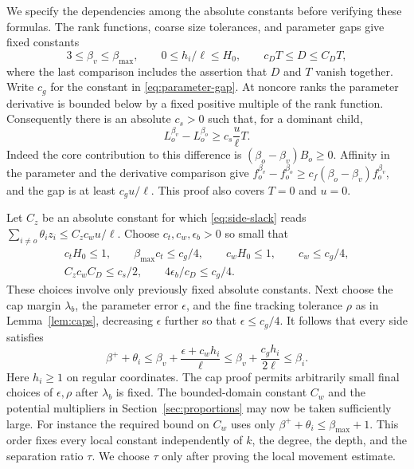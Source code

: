 We specify the dependencies among the absolute constants before verifying
these formulas.  The rank functions, coarse size tolerances, and parameter
gaps give fixed constants
\[
 3\le\beta_v\le\beta_{\max},\qquad
 0\le h_i/\ell\le H_0,\qquad
 c_DT\le D\le C_DT,
\]
where the last comparison includes the assertion that \(D\) and \(T\)
vanish together.  Write \(c_g\) for the constant in
\eqref{eq:parameter-gap}.  At noncore ranks the parameter derivative is
bounded below by a fixed positive multiple of the rank function.
Consequently there is an absolute \(c_s>0\) such that, for a dominant
child,
\begin{equation}
 L_o^{\beta_v}-L_o^{\beta_o}
   \ge c_s\frac{u}{\ell}T.
 \label{eq:dominant-output-slack}
\end{equation}
Indeed the core contribution to this difference is
\((\beta_o-\beta_v)B_o\ge0\).  Affinity in the parameter and the
derivative comparison give
\(f_o^{\beta_v}-f_o^{\beta_o}
\ge c_f(\beta_o-\beta_v)f_o^{\beta_v}\), and the gap is at least
\(c_g u/\ell\).  This proof also covers \(T=0\) and \(u=0\).

Let \(C_z\) be an absolute constant for which
\eqref{eq:side-slack} reads
\(\sum_{i\ne o}\theta_i z_i\le C_z c_wu/\ell\).
Choose \(c_t,c_w,\epsilon_b>0\) so small that
\begin{gather}
 c_tH_0\le1,\qquad \beta_{\max}c_t\le c_g/4,
 \qquad c_wH_0\le1,\qquad c_w\le c_g/4,
 \label{eq:output-constant-smallness}\\
 C_zc_wC_D\le c_s/2,
 \qquad 4\epsilon_b/c_D\le c_g/4.
 \nonumber
\end{gather}
These choices involve only previously fixed absolute constants.  Next
choose the cap margin \(\lambda_b\), the parameter error \(\epsilon\),
and the fine tracking tolerance \(\rho\) as in Lemma~\ref{lem:caps},
decreasing \(\epsilon\) further so that \(\epsilon\le c_g/4\).
It follows that every side satisfies
\begin{equation}
 \beta^++\theta_i
 \le\beta_v+\frac{\epsilon+c_wh_i}{\ell}
 \le\beta_v+\frac{c_gh_i}{2\ell}
 \le\beta_i.
 \label{eq:side-parameter-room}
\end{equation}
Here \(h_i\ge1\) on regular coordinates.  The cap proof permits arbitrarily
small final choices of \(\epsilon,\rho\) after \(\lambda_b\) is fixed.
The bounded-domain constant \(C_w\) and the potential multipliers in
Section~\ref{sec:proportions} may now be taken sufficiently large.
For instance the required bound on \(C_w\) uses only
\(\beta^++\theta_i\le\beta_{\max}+1\).
This order fixes every local constant independently of \(k\), the degree,
the depth, and the separation ratio \(\tau\).  We choose \(\tau\) only
after proving the local movement estimate.

